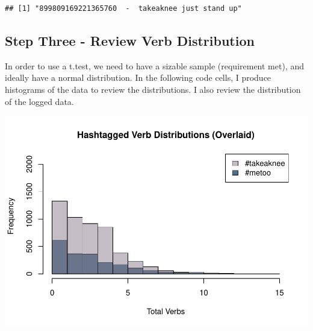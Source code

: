 \documentclass[]{article}
\newenvironment{Shaded}{\begin{snugshade}}{\end{snugshade}}
\newcommand{\KeywordTok}[1]{\textcolor[rgb]{0.13,0.29,0.53}{\textbf{#1}}}
\newcommand{\DataTypeTok}[1]{\textcolor[rgb]{0.13,0.29,0.53}{#1}}
\newcommand{\DecValTok}[1]{\textcolor[rgb]{0.00,0.00,0.81}{#1}}
\newcommand{\StringTok}[1]{\textcolor[rgb]{0.31,0.60,0.02}{#1}}
\newcommand{\CommentTok}[1]{\textcolor[rgb]{0.56,0.35,0.01}{\textit{#1}}}
\newcommand{\OperatorTok}[1]{\textcolor[rgb]{0.81,0.36,0.00}{\textbf{#1}}}
\newcommand{\NormalTok}[1]{#1}
\begin{document}
\begin{verbatim}
## [1] "899809169221365760  -  takeaknee just stand up"
\end{verbatim}

\subsection{Step Three - Review Verb
Distribution}\label{step-three---review-verb-distribution}

In order to use a t.test, we need to have a sizable sample (requirement
met), and ideally have a normal distribution. In the following code
cells, I produce histograms of the data to review the distributions. I
also review the distribution of the logged data.

\begin{Shaded}
\end{Shaded}

\includegraphics{figure/hist_total_verbs_overlaid-1.pdf}
\end{document}

